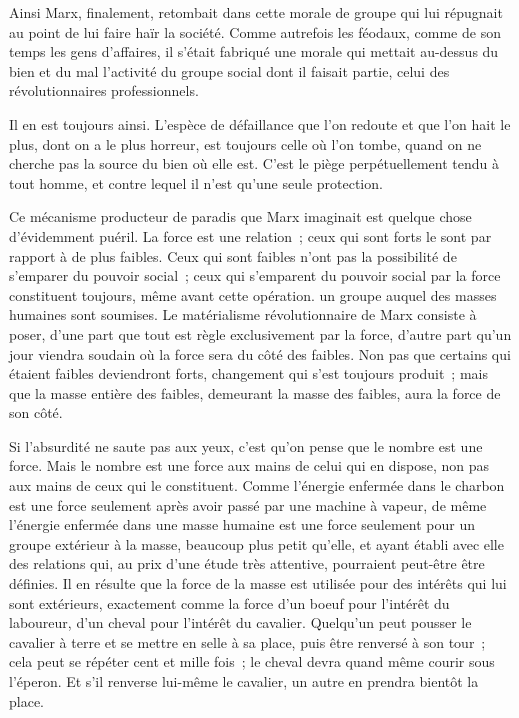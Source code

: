 \documentclass[french,twoside]{book} %
\begin{document}
Ainsi Marx, finalement, retombait dans cette morale de groupe qui lui répugnait au point de lui faire haïr la société. Comme autrefois les féodaux, comme de son temps les gens d'affaires, il s'était fabriqué une morale qui mettait au-dessus du bien et du mal l'activité du groupe social dont il faisait partie, celui des révolutionnaires professionnels.\par
Il en est toujours ainsi. L'espèce de défaillance que l'on redoute et que l'on hait le plus, dont on a le plus horreur, est toujours celle où l'on tombe, quand on ne cherche pas la source du bien où elle est. C'est le piège perpétuellement tendu à tout homme, et contre lequel il n'est qu'une seule protection.\par
Ce mécanisme producteur de paradis que Marx imaginait est quelque chose d'évidemment puéril. La force est une relation ; ceux qui sont forts le sont par rapport à de plus faibles. Ceux qui sont faibles n'ont pas la possibilité de s'emparer du pouvoir social ; ceux qui s'emparent du pouvoir social par la force constituent toujours, même avant cette opération. un groupe auquel des masses humaines sont soumises. Le matérialisme révolutionnaire de Marx consiste à poser, d'une part que tout est règle exclusivement par la force, d'autre part qu'un jour viendra soudain où la force sera du côté des faibles. Non pas que certains qui étaient faibles deviendront forts, changement qui s'est toujours produit ; mais que la masse entière des faibles, demeurant la masse des faibles, aura la force de son côté.\par
Si l'absurdité ne saute pas aux yeux, c'est qu'on pense que le nombre est une force. Mais le nombre est une force aux mains de celui qui en dispose, non pas aux mains de ceux qui le constituent. Comme l'énergie enfermée dans le charbon est une force seulement après avoir passé par une machine à vapeur, de même l'énergie enfermée dans une masse humaine est une force seulement pour un groupe extérieur à la masse, beaucoup plus petit qu'elle, et ayant établi avec elle des relations qui, au prix d'une étude très attentive, pourraient peut-être être définies. Il en résulte que la force de la masse est utilisée pour des intérêts qui lui sont extérieurs, exactement comme la force d'un boeuf pour l'intérêt du laboureur, d'un cheval pour l'intérêt du cavalier. Quelqu'un peut pousser le cavalier à terre et se mettre en selle à sa place, puis être renversé à son tour ; cela peut se répéter cent et mille fois ; le cheval devra quand même courir sous l'éperon. Et s'il renverse lui-même le cavalier, un autre en prendra bientôt la place.\par
\end{document}
